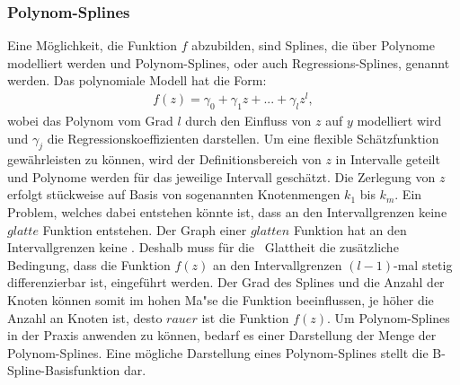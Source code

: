 \documentclass[12pt]{scrreprt}
\begin{document}
\subsubsection{Polynom-Splines}
	Eine Möglichkeit, die Funktion $f$ abzubilden, sind Splines, die über Polynome modelliert werden und Polynom-Splines, oder auch Regressions-Splines, genannt werden. Das polynomiale Modell hat die Form: 
\begin{align}
f(z)=\gamma_{0}+\gamma_{1}z+...+\gamma_{l}z^l,
\end{align}
wobei das Polynom vom Grad $l$ durch den Einfluss von $z$ auf $y$ modelliert wird und $\gamma_{j}$ die Regressionskoeffizienten darstellen. Um eine flexible Schätzfunktion gewährleisten zu können, wird der Definitionsbereich von $z$ in Intervalle geteilt und Polynome werden für das jeweilige Intervall geschätzt. Die Zerlegung von $z$ erfolgt stückweise auf Basis von sogenannten Knotenmengen $k_{1}$ bis $k_{m}$.  Ein Problem, welches dabei entstehen könnte ist, dass an den Intervallgrenzen keine $glatte$ Funktion entstehen. Der Graph einer $glatten$ Funktion hat an den Intervallgrenzen keine . Deshalb muss für die \grqq ~Glattheit die zusätzliche Bedingung, dass die Funktion $f(z)$ an den Intervallgrenzen $(l-1)$-mal stetig differenzierbar ist, eingeführt werden. Der Grad des Splines und die Anzahl der Knoten können somit im hohen Ma"se die Funktion beeinflussen, je höher die Anzahl an Knoten ist, desto $rauer$ ist die Funktion $f(z)$. Um Polynom-Splines in der Praxis anwenden zu können, bedarf es einer Darstellung der Menge der Polynom-Splines. Eine mögliche Darstellung eines Polynom-Splines stellt die B-Spline-Basisfunktion dar.
\end{document}
